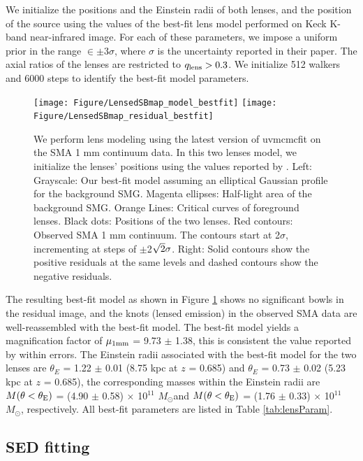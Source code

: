 \documentclass{emulateapj}
\newcommand{\Msun}{\mbox{$M_{\odot}$}}
\begin{document}
We initialize the positions and the Einstein radii of both lenses, and the position of the source using the
values of the best-fit lens model \citet{Haas14} performed on Keck K-band near-infrared image. For each of
these parameters, we impose a uniform prior in the range $\in\pm$3$\sigma$, where $\sigma$ is the uncertainty
reported in their paper. The axial ratios of the lenses are restricted to $q_{\rm lens} > 0.3$. We initialize 512
walkers and 6000 steps to identify the best-fit model parameters.
\begin{figure}[!tbpH]
\centering
\texttt{[image: Figure/LensedSBmap\_model\_bestfit]}
\texttt{[image: Figure/LensedSBmap\_residual\_bestfit]}
\caption{We perform lens modeling using the latest version of {\sc uvmcmcfit} on the SMA 1 mm continuum data.
In this two lenses model, we initialize the lenses' positions using the values reported by \citet{Haas14}. Left:
Grayscale: Our best-fit model assuming an elliptical Gaussian profile for the background SMG. Magenta ellipses:
Half-light area of the background SMG. Orange Lines: Critical curves of foreground lenses. Black dots: Positions of
the two lenses. Red contours: Observed SMA 1 mm continuum. The contours start at 2$\sigma$, incrementing at
steps of $\pm$2$\sqrt{\rm 2}\sigma$. Right: Solid contours show the positive residuals at the same levels and dashed contours
show the negative residuals. \label{fig:lens}}
\end{figure}

The resulting best-fit model as shown in Figure \ref{fig:lens} shows no significant bowls in the residual
image, and the knots (lensed emission) in the observed SMA data are well-reassembled with the best-fit model.
The best-fit model yields a magnification
factor of $\mu_{\rm 1mm}$ = 9.73 $\pm$ 1.38, this is consistent the value reported by \citet{Haas14} within errors. The Einstein radii associated with the best-fit model for the two lenses are $\theta_{E}$ =
1.22 $\pm$ 0.01 (8.75 kpc at $z$ = 0.685) and $\theta_{E}$ = 0.73 $\pm$ 0.02 (5.23 kpc at $z$ = 0.685),
the corresponding masses within the Einstein radii are $M(\theta < \theta_{\rm E})$ = (4.90 $\pm$ 0.58) $\times$ 10$^{11}$ 
\Msun and $M(\theta < \theta_{\rm E})$ = (1.76 $\pm$ 0.33) $\times$ 10$^{11}$ \Msun, respectively. All best-fit
parameters are listed in Table \ref{tab:lensParam}.


\subsection{SED fitting} \label{sec:SED}
\end{document}
